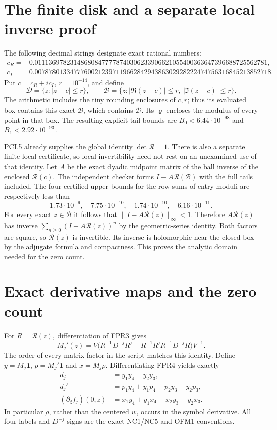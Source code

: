 \documentclass[11pt]{article}
\begin{document}
\section{The finite disk and a separate local inverse proof}
The following decimal strings designate exact rational numbers:
\[
 \begin{split}
 c_R={}&0.011136978231486808477778740306233906621055400363647396688725562781,\\
 c_I={}&0.0078780133477760021239711966284294386302928222474756316845213852718.
 \end{split}\tag{FPR11}
\]
Put $c=c_R+ic_I$, $r=10^{-14}$, and define
\[
 \mathcal D=\{z:|z-c|\le r\},\qquad
 \mathcal B=\{z:|\Re(z-c)|\le r,\ |\Im(z-c)|\le r\}.
 \tag{FPR12}
\]
The arithmetic includes the tiny rounding enclosures of $c,r$;
thus its evaluated box contains this exact $\mathcal B$, which
contains $\mathcal D$. Its $\varrho$ encloses the modulus of
every point in that box. The resulting explicit tail bounds are
$B_0<6.44\cdot10^{-98}$ and $B_1<2.92\cdot10^{-93}$.

PCL5 already supplies the global identity $\det\mathcal R=1$.
There is also a separate finite local certificate, so local
invertibility need not rest on an unexamined use of that identity.
Let $A$ be the exact dyadic midpoint matrix of the ball inverse
of the enclosed $\mathcal R(c)$. The independent checker forms
$I-A\mathcal R(\mathcal B)$ with the full tails included.
The four certified upper bounds for the row sums of entry
moduli are respectively less than
\[
 1.73\cdot10^{-9},\quad 7.75\cdot10^{-10},\quad
 1.74\cdot10^{-10},\quad 6.16\cdot10^{-11}.
 \tag{FPR13}
\]
For every exact $z\in\mathcal B$ it follows that
$\|I-A\mathcal R(z)\|_\infty<1$. Therefore
$A\mathcal R(z)$ has inverse
$\sum_{n\ge0}(I-A\mathcal R(z))^n$ by the geometric-series
identity. Both factors are square, so $\mathcal R(z)$ is
invertible. Its inverse is holomorphic near the closed box by
the adjugate formula and compactness. This proves the analytic
domain needed for the zero count.

\section{Exact derivative maps and the zero count}
For $R=\mathcal R(z)$, differentiation of FPR3 gives
\[
 M_j'(z)=V\bigl(R^{-1}D^{-j}R'
          -R^{-1}R'R^{-1}D^{-j}R\bigr)V^{-1}.
 \tag{FPR14}
\]
The order of every matrix factor in the script matches this
identity. Define $y=M_j\mathbf1$, $p=M_j'\mathbf1$ and
$x=M_j\rho$. Differentiating FPR4 yields exactly
\[
 \begin{split}
 d_j&=y_1y_4-y_2y_3,\\
 d_j'&=p_1y_4+y_1p_4-p_2y_3-y_2p_3,\\
 (\partial_\xi f_j)(0,z)&=x_1y_4+y_1x_4-x_2y_3-y_2x_3.
 \end{split}\tag{FPR15}
\]
In particular $\rho$, rather than the centered $w$, occurs in
the symbol derivative. All four labels and $D^{-j}$ signs are
the exact NC1/NC5 and OFM1 conventions.
\end{document}
